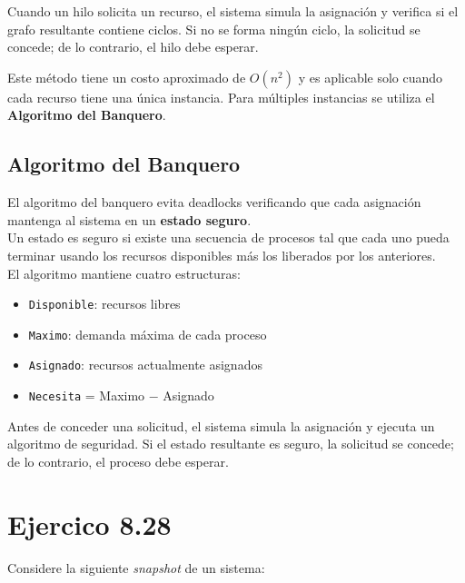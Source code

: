 \documentclass[12pt,letterpaper]{article}
\begin{document}
Cuando un hilo solicita un recurso, el sistema simula la asignación y verifica si el grafo resultante contiene
ciclos. Si no se forma ningún ciclo, la solicitud se concede; de lo contrario, el hilo debe esperar.

Este método tiene un costo aproximado de $O(n^2)$ y es aplicable solo cuando cada recurso tiene una única
instancia. Para múltiples instancias se utiliza el \textbf{Algoritmo del Banquero}.

\subsection*{Algoritmo del Banquero}

El algoritmo del banquero evita deadlocks verificando que cada asignación mantenga al sistema en un \textbf{estado seguro}.\\

\noindent
Un estado es seguro si existe una secuencia de procesos tal que cada uno pueda terminar usando los recursos
disponibles más los liberados por los anteriores.\\

\noindent
El algoritmo mantiene cuatro estructuras:

\begin{itemize}
\item \texttt{Disponible}: recursos libres
\item \texttt{Maximo}: demanda máxima de cada proceso
\item \texttt{Asignado}: recursos actualmente asignados
\item \texttt{Necesita} = Maximo $-$ Asignado
\end{itemize}

Antes de conceder una solicitud, el sistema simula la asignación y ejecuta un algoritmo de seguridad.
Si el estado resultante es seguro, la solicitud se concede; de lo contrario, el proceso debe esperar.

\newpage

\section*{Ejercico 8.28}

Considere la siguiente \textit{snapshot} de un sistema:
\end{document}
